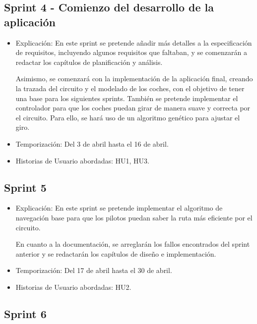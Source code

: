 \subsection{Sprint 4 - Comienzo del desarrollo de la aplicación}
\begin{itemize}
    \item Explicación: En este sprint se pretende añadir más detalles a la especificación de requisitos, incluyendo algunos requisitos que faltaban, y se comenzarán a redactar los capítulos de planificación y análisis.
    
    Asimismo, se comenzará con la implementación de la aplicación final, creando la trazada del circuito y el modelado de los coches, con el objetivo de tener una base para los siguientes sprints. También se pretende implementar el controlador para que los coches puedan girar de manera suave y correcta por el circuito. Para ello, se hará uso de un algoritmo genético para ajustar el giro.

    \item Temporización: Del 3 de abril hasta el 16 de abril.
    \item Historias de Usuario abordadas: HU1, HU3.
\end{itemize}

\subsection{Sprint 5}
\begin{itemize}
    \item Explicación: En este sprint se pretende implementar el algoritmo de navegación base para que los pilotos puedan saber la ruta más eficiente por el circuito.


    En cuanto a la documentación, se arreglarán los fallos encontrados del sprint anterior y se redactarán los capítulos de diseño e implementación.

    \item Temporización: Del 17 de abril hasta el 30 de abril.
    \item Historias de Usuario abordadas: HU2.
\end{itemize}

\newpage

\subsection{Sprint 6}

